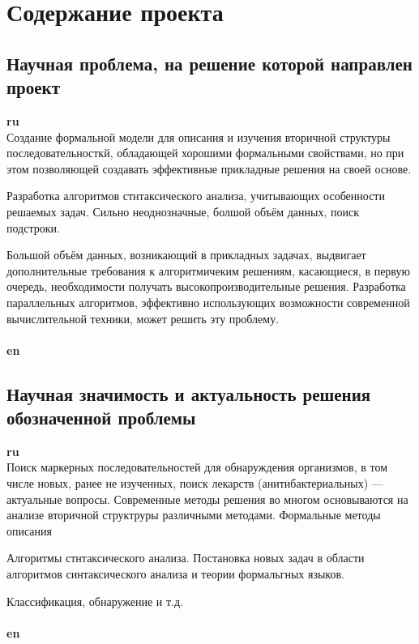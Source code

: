 \documentclass[12pt]{article}  %
\theoremstyle{remark}
\begin{document}
\section{Содержание проекта}

\subsection{Научная проблема, на решение которой направлен проект}

\textbf{ru}\\
Создание формальной модели для описания и изучения вторичной структуры последовательносткй, обладающей хорошими формальными свойствами, но при этом позволяющей создавать эффективные прикладные решения на своей основе.

Разработка алгоритмов стнтаксического анализа, учитывающих особенности решаемых задач. 
Сильно неоднозначные, болшой объём данных, поиск подстроки. 

Большой объём данных, возникающий в прикладных задачах, выдвигает дополнительные требования к алгоритмичеким решениям, касающиеся, в первую очередь, необходимости получать высокопроизводительные решения.
Разработка параллельных алгоритмов, эффективно использующих возможности современной вычислительной техники, может решить эту проблему.
\\
\\
\textbf{en}\\



\subsection{Научная значимость и актуальность решения обозначенной проблемы}

\textbf{ru}\\
Поиск маркерных последовательностей для обнаруждения организмов, в том числе новых, ранее не изученных, поиск лекарств (анитибактериальных) --- актуальные вопросы.
Современные методы решения во многом основываются на анализе вторичной структруры различными методами.
Формальные методы описания

Алгоритмы стнтаксического анализа. 
Постановка новых задач в области алгоритмов синтаксического анализа и теории формальгных языков.

Классификация, обнаружение и т.д.
\\
\\
\textbf{en}\\
\end{document}
